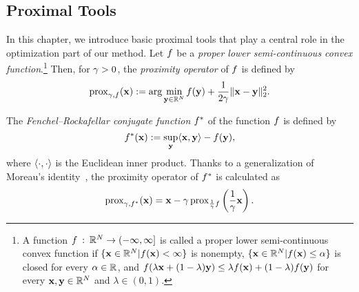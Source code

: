 \subsection{Proximal Tools}
\label{subsec:Prox}
In this chapter, we introduce basic proximal tools that play a central role in the optimization part of our method.
Let $f$ be a \textit{proper lower semi-continuous convex function}.\footnote{A function $f \: : \: \mathbb{R}^{N} \rightarrow ( -\infty, \infty ]$ is called a proper lower semi-continuous convex function if $\lbrace \mathbf{x} \in \mathbb{R}^{N} | f(\mathbf{x}) < \infty \rbrace$ is nonempty, $\lbrace \mathbf{x} \in \mathbb{R}^{N} | f(\mathbf{x}) \leq \alpha \rbrace$ is closed for every $\alpha \in \mathbb{R}^{}$, and $f(\lambda \mathbf{x} + (1-\lambda)\mathbf{y}) \leq \lambda f(\mathbf{x}) + (1-\lambda)f(\mathbf{y})$ for every $\mathbf{x}, \mathbf{y} \in \mathbb{R}^{N}$ and $\lambda \in (0, 1)$.}
Then, for $\gamma > 0$, the \textit{proximity operator} of $f$ is defined by
\begin{equation}
	\label{eq:Prox}
	\operatorname{prox}_{\gamma, f}(\mathbf{x}) := \arg\min_{\mathbf{y} \in \mathbb{R}^{N}} f(\mathbf{y}) + \frac{1}{2 \gamma} \| \mathbf{x} - \mathbf{y} \|_{2}^{2}.
\end{equation}


The \textit{Fenchel--Rockafellar conjugate function} $f^{*}$ of the function $f$ is defined by
\begin{equation}
	\label{eq:ConjugateFunction}
	\FuncProx^{*}(\VarProxOne) := \sup_{\VarProxTwo} \InnerProduct<\VarProxOne, \VarProxTwo> - \FuncProx(\VarTwo),
\end{equation}
where $\InnerProduct<\cdot , \cdot>$ is the Euclidean inner product.
Thanks to a generalization of Moreau's identity~\cite{Combettes2013Moreau}, the proximity operator of $f^{*}$ is calculated as
\begin{equation}
	\label{eq:ProxConjugate}
	\operatorname{prox}_{\gamma, f^{*}}(\mathbf{x}) = \mathbf{x} - \gamma \operatorname{prox}_{\frac{1}{\gamma} f} \left( \frac{1}{\gamma} \mathbf{x} \right).
\end{equation}


